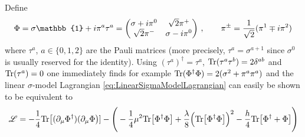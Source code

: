 Define
\begin{equation}
    \Phi=\sigma\mathbb{1}+\imagu\pi^a\tau^a=\begin{pmatrix}
        \sigma+\imagu\pi^0 & \sqrt{2}\pi^+      \\
        \sqrt{2}\pi^-      & \sigma-\imagu\pi^0
    \end{pmatrix}\,,\qquad\pi^\pm=\frac{1}{\sqrt{2}}(\pi^1\mp\imagu\pi^2)
\end{equation}
where $\tau^a$, $a\in\{0,1,2\}$ are the Pauli matrices (more precisely, $\tau^a=\sigma^{a+1}$ since $\sigma^0$ is usually reserved for the identity). Using $(\tau^a)^\dagger=\tau^a$, ${\text{Tr}}(\tau^a\tau^b)=2\delta^{ab}$ and ${\text{Tr}}(\tau^a)=0$ one immediately finds for example ${\text{Tr}}(\Phi^\dagger\Phi)=2(\sigma^2+\pi^a\pi^a)$ and the linear $\sigma$-model Lagrangian \eqref{eq:LinearSigmaModelLagrangian} can easily be shown to be equivalent to
\begin{equation}
    \mathscr{L}=-\frac{1}{4}{\text{Tr}}\big[(\partial_\mu\Phi^\dagger)(\partial_\mu\Phi\big)]-\Bigg(-\frac{1}{4}\mu^2{\text{Tr}}\big[\Phi^\dagger\Phi\big]+\frac{\lambda}{8}\Big({\text{Tr}}\big[\Phi^\dagger\Phi\big]\Big)^2-\frac{h}{4}{\text{Tr}}\big[\Phi^\dagger+\Phi\big]\Bigg)
    \label{eq:Lagrangian_LinearSigma2}
\end{equation}


